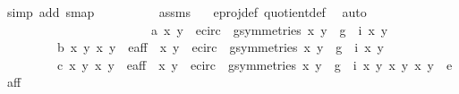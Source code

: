 \begin{isabellebody}
{\isacharparenleft}simp\ add{\isacharcolon}\ s{\isacharunderscore}map{\isacharparenright}\isanewline
\ \ \ \ \ \ \ \ \isamarkupfalse%
\ assms{\isacharparenleft}{}{\isacharparenright}\ \isamarkupfalse%
\ {}\ e{\isacharunderscore}proj{\isacharunderscore}def\ quotient{\isacharunderscore}def\ \isamarkupfalse%
\ auto\isanewline
\ \ \ \ \isamarkupfalse%
\isanewline
\ \ \ \ \ \ \isamarkupfalse%
\ {}\ \ \ \ \isanewline
\ \ \isanewline
\ \ \ \ \ \ \isamarkupfalse%
\isanewline
\ \ \ \ \ \ \ \ {\isacharparenleft}a{\isacharparenright}\ {\isachardoublequoteopen}{\isacharparenleft}x{\isacharcomma}\ y{\isacharparenright}\ {\isasymin}\ e{\isacharunderscore}circ\ {\isasymand}\ {\isacharparenleft}{\isasymexists}g{\isasymin}symmetries{\isachardot}\ {\isacharparenleft}x{\isacharprime}{\isacharcomma}\ y{\isacharprime}{\isacharparenright}\ {\isacharequal}\ {\isacharparenleft}g\ {\isasymcirc}\ i{\isacharparenright}\ {\isacharparenleft}x{\isacharcomma}\ y{\isacharparenright}{\isacharparenright}{\isachardoublequoteclose}\ {\isacharbar}\isanewline
\ \ \ \ \ \ \ \ {\isacharparenleft}b{\isacharparenright}\ {\isachardoublequoteopen}{\isacharparenleft}{\isacharparenleft}x{\isacharcomma}\ y{\isacharparenright}{\isacharcomma}\ x{\isacharprime}{\isacharcomma}\ y{\isacharprime}{\isacharparenright}\ {\isasymin}\ e{\isacharunderscore}aff{\isacharunderscore}{}{\isachardoublequoteclose}\ {\isachardoublequoteopen}{\isasymnot}\ {\isacharparenleft}{\isacharparenleft}x{\isacharcomma}\ y{\isacharparenright}\ {\isasymin}\ e{\isacharunderscore}circ\ {\isasymand}\ {\isacharparenleft}{\isasymexists}g{\isasymin}symmetries{\isachardot}\ {\isacharparenleft}x{\isacharprime}{\isacharcomma}\ y{\isacharprime}{\isacharparenright}\ {\isacharequal}\ {\isacharparenleft}g\ {\isasymcirc}\ i{\isacharparenright}\ {\isacharparenleft}x{\isacharcomma}\ y{\isacharparenright}{\isacharparenright}{\isacharparenright}{\isachardoublequoteclose}\ {\isacharbar}\isanewline
\ \ \ \ \ \ \ \ {\isacharparenleft}c{\isacharparenright}\ {\isachardoublequoteopen}{\isacharparenleft}{\isacharparenleft}x{\isacharcomma}\ y{\isacharparenright}{\isacharcomma}\ x{\isacharprime}{\isacharcomma}\ y{\isacharprime}{\isacharparenright}\ {\isasymin}\ e{\isacharunderscore}aff{\isacharunderscore}{}{\isachardoublequoteclose}\ {\isachardoublequoteopen}{\isasymnot}\ {\isacharparenleft}{\isacharparenleft}x{\isacharcomma}\ y{\isacharparenright}\ {\isasymin}\ e{\isacharunderscore}circ\ {\isasymand}\ {\isacharparenleft}{\isasymexists}g{\isasymin}symmetries{\isachardot}\ {\isacharparenleft}x{\isacharprime}{\isacharcomma}\ y{\isacharprime}{\isacharparenright}\ {\isacharequal}\ {\isacharparenleft}g\ {\isasymcirc}\ i{\isacharparenright}\ {\isacharparenleft}x{\isacharcomma}\ y{\isacharparenright}{\isacharparenright}{\isacharparenright}{\isachardoublequoteclose}\ {\isachardoublequoteopen}{\isacharparenleft}{\isacharparenleft}x{\isacharcomma}\ y{\isacharparenright}{\isacharcomma}\ x{\isacharprime}{\isacharcomma}\ y{\isacharprime}{\isacharparenright}\ {\isasymnotin}\ e{\isacharunderscore}aff{\isacharunderscore}{}{\isachardoublequoteclose}\isanewline

\end{isabellebody}

